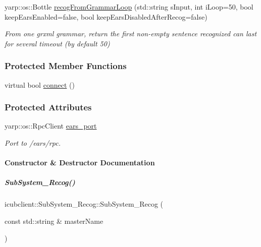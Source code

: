 \begin{DoxyCompactItemize}
yarp\+::os\+::\+Bottle \hyperlink{group__icubclient__subsystems_ab0fdeaa8f84fb8d1062259921407d0f7}{recog\+From\+Grammar\+Loop} (std\+::string s\+Input, int i\+Loop=50, bool keep\+Ears\+Enabled=false, bool keep\+Ears\+Disabled\+After\+Recog=false)
\begin{DoxyCompactList}\small\item\em From one grxml grammar, return the first non-\/empty sentence recognized can last for several timeout (by default 50) \end{DoxyCompactList}\end{DoxyCompactItemize}
\subsubsection*{Protected Member Functions}
\begin{DoxyCompactItemize}
\item 
virtual bool \hyperlink{group__icubclient__subsystems_a98acf2fdda5a595803ce2e75e045a56f}{connect} ()
\end{DoxyCompactItemize}
\subsubsection*{Protected Attributes}
\begin{DoxyCompactItemize}
\item 
yarp\+::os\+::\+Rpc\+Client \hyperlink{group__icubclient__subsystems_a895230717fd1aa2d6a0ed9d29e0069d7}{ears\+\_\+port}
\begin{DoxyCompactList}\small\item\em Port to /ears/rpc. \end{DoxyCompactList}\end{DoxyCompactItemize}


\paragraph{Constructor \& Destructor Documentation}
\mbox{\label{group__icubclient__subsystems_a34901d18dab1e223997127715c77128a}} 
\subparagraph{\texorpdfstring{Sub\+System\+\_\+\+Recog()}{SubSystem\_Recog()}}
{\footnotesize\ttfamily icubclient\+::\+Sub\+System\+\_\+\+Recog\+::\+Sub\+System\+\_\+\+Recog (\begin{DoxyParamCaption}\item[{const std\+::string \&}]{master\+Name }\end{DoxyParamCaption})}



